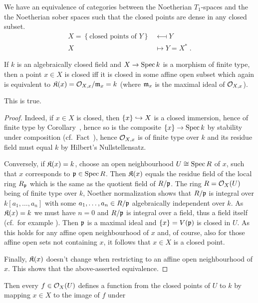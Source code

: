 \documentclass[a4paper,parskip=half,numbers=enddot, DIV=12]{scrreprt}
\begin{document}
\begin{fact}
    We have an equivalence of categories between the Noetherian $T_1$-spaces and the the Noetherian sober spaces such that the closed points are dense in any closed subset. 
    \begin{align*}
        X =\left\{\text{closed points of } Y\right\} &\longmapsfrom Y\\
        X&\longmapsto Y= X^*\;.
    \end{align*}
\end{fact}
If $k$ is an algebraically closed field and $X\morphism \Spec k$ is a morphism of finite type, then a point $x\in X$ is closed iff it is closed in some affine open subset which again is equivalent to $\mathfrak{K}(x)=\mathcal{O}_{X,x}/\mathfrak{m}_x = k$ (where $\mathfrak{m}_x$ is the maximal ideal of $\mathcal{O}_{X,x}$). 
\begin{claim*}
	This is true.
\end{claim*}
\begin{proof}
	Indeed, if $x\in X$ is closed, then $\{x\}\monomorphism X$ is a closed immersion, hence of finite type by Corollary~, hence so is the composite $\{x\}\morphism\Spec k$ by stability under composition (cf.\ Fact~), hence $\mathcal{O}_{X,x}$ is of finite type over $k$ and its residue field must equal $k$ by Hilbert's Nullstellensatz.
	
	Conversely, if $\mathfrak{K}(x)=k$, choose an open neighbourhood $U\cong \operatorname{Spec} R$ of $x$, such that $x$ corresponds to $\mathfrak{p}\in\operatorname{Spec} R$. Then $\mathfrak{K}(x)$ equals the residue field of the local ring $R_{\mathfrak{p}}$ which is the same as the quotient field of $R/\mathfrak{p}$. The ring $R=\mathcal{O}_X(U)$ being of finite type over $k$, Noether normalization  shows that $R/\mathfrak{p}$ is integral over $k[a_1,\ldots,a_n]$ with some $a_1,\ldots,a_n\in R/\mathfrak{p}$ algebraically independent over $k$. As $\mathfrak{K}(x)=k$ we must have $n=0$ and $R/\mathfrak{p}$ is integral over a field, thus a field itself (cf.\ for example \cite[Proposition~1.5.1]{alg1}). Then $\mathfrak{p}$ is a maximal ideal and $\{x\}=V(\mathfrak{p})$ is closed in $U$. As this holds for any affine open neighbourhood of $x$ and, of course, also for those affine open sets not containing $x$, it follows that $x\in X$ is a closed point.
	
	Finally, $\mathfrak{K}(x)$ doesn't change when restricting to an affine open neighbourhood of $x$. This shows that the above-asserted equivalence.
\end{proof}
Then every $f\in \mathcal{O}_X(U)$ defines a function from the closed points of $U$ to $k$ by mapping $x\in X$ to the image of $f$ under
\end{document}
